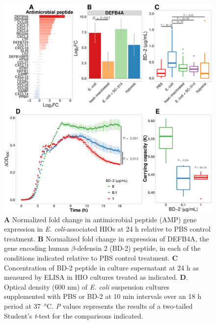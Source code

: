 \documentclass[9pt,lineo]{elife}
\begin{document}
\begin{figure}
\begin{fullwidth}
\centering
\includegraphics[width=0.95\linewidth]{./figures/figure6/figure6_multipanel.pdf}
\caption{\textbf{A} Normalized fold change in antimicrobial peptide (AMP) gene expression in \textit{E. coli}-associated HIOs at 24 h relative to PBS control treatment. \textbf{B} Normalized fold change in expression of DEFB4A, the gene encoding human $\beta$-defensin 2 (BD-2) peptide, in each of the conditions indicated relative to PBS control treatment. \textbf{C} Concentration of BD-2 peptide in culture supernatant at 24 h as measured by ELISA in HIO cultures treated as indicated. \textbf{D}. Optical density (600 nm) of \textit{E. coli} suspension cultures supplemented with PBS or BD-2 at 10 min intervals over an 18 h period at \SI{37}{\celsius}. \textit{P} values represents the results of a two-tailed Student's \textit{t}-test  for the comparisons indicated.}
\label{fig:fullwidth}
\end{fullwidth}
\end{figure}
\end{document}
